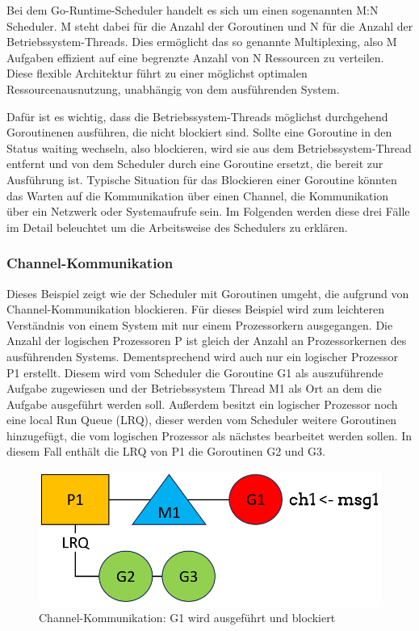 \documentclass[fontsize=12pt,paper=a4,twoside=semi,parskip=half-,headsepline,headinclude]{scrreprt}
\begin{document}
Bei dem Go-Runtime-Scheduler handelt es sich um einen sogenannten M:N Scheduler. M steht dabei für die Anzahl der Goroutinen und N für die Anzahl der Betriebssystem-Threads. Dies ermöglicht das so genannte Multiplexing, also M Aufgaben effizient auf eine begrenzte Anzahl von N Ressourcen zu verteilen. Diese flexible Architektur führt zu einer möglichst optimalen Ressourcenausnutzung, unabhängig von dem ausführenden System.

Dafür ist es wichtig, dass die Betriebssystem-Threads möglichst durchgehend Goroutinenen ausführen, die nicht blockiert sind. Sollte eine Goroutine in den Status waiting wechseln, also blockieren, wird sie aus dem Betriebssystem-Thread entfernt und von dem Scheduler durch eine Goroutine ersetzt, die bereit zur Ausführung ist. Typische Situation für das Blockieren einer Goroutine könnten das Warten auf die Kommunikation über einen Channel, die Kommunikation über ein Netzwerk oder Systemaufrufe sein. Im Folgenden werden diese drei Fälle im Detail beleuchtet um die Arbeitsweise des Schedulers zu erklären.

\subsubsection{Channel-Kommunikation}

Dieses Beispiel zeigt wie der Scheduler mit Goroutinen umgeht, die aufgrund von Channel-Kommunikation blockieren. Für dieses Beispiel wird zum leichteren Verständnis von einem System mit nur einem Prozessorkern ausgegangen. Die Anzahl der logischen Prozessoren P ist gleich der Anzahl an Prozessorkernen des ausführenden Systems.  Dementsprechend wird auch nur ein logischer Prozessor P1 erstellt. Diesem wird vom Scheduler die Goroutine G1 als auszuführende Aufgabe zugewiesen und der Betriebssystem Thread M1 als Ort an dem die Aufgabe ausgeführt werden soll. Außerdem besitzt ein logischer Prozessor noch eine local Run Queue (LRQ), dieser werden vom Scheduler weitere Goroutinen hinzugefügt, die vom logischen Prozessor als nächstes bearbeitet werden sollen. In diesem Fall enthält die LRQ von P1 die Goroutinen G2 und G3.

\begin{figure}[h]
	\centering
	\includegraphics[scale=0.5]{figures/GoroutineChannel1.png}
	\caption{Channel-Kommunikation: G1 wird ausgeführt und blockiert}
	\label{fig:GoroutineChannel1}
\end{figure}
\end{document}
